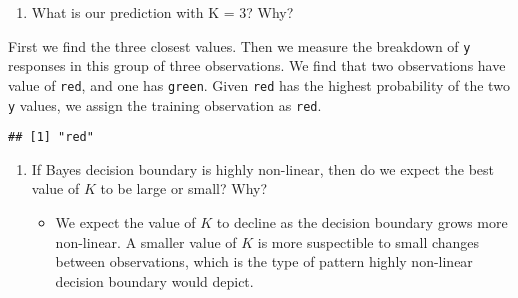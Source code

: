 \documentclass[]{book}
\newenvironment{Shaded}{\begin{snugshade}}{\end{snugshade}}
\newcommand{\DataTypeTok}[1]{\textcolor[rgb]{0.13,0.29,0.53}{#1}}
\newcommand{\DecValTok}[1]{\textcolor[rgb]{0.00,0.00,0.81}{#1}}
\newcommand{\KeywordTok}[1]{\textcolor[rgb]{0.13,0.29,0.53}{\textbf{#1}}}
\newcommand{\NormalTok}[1]{#1}
\newcommand{\OperatorTok}[1]{\textcolor[rgb]{0.81,0.36,0.00}{\textbf{#1}}}
\newcommand{\StringTok}[1]{\textcolor[rgb]{0.31,0.60,0.02}{#1}}
\providecommand{\tightlist}{%
  \setlength{\itemsep}{0pt}\setlength{\parskip}{0pt}}
\begin{document}
\begin{enumerate}
\def\labelenumi{(\alph{enumi})}
\setcounter{enumi}{2}
\tightlist
\item
  What is our prediction with K = 3? Why?
\end{enumerate}

First we find the three closest values. Then we measure the breakdown of \texttt{y} responses in this group of three observations. We find that two observations have value of \texttt{red}, and one has \texttt{green}. Given \texttt{red} has the highest probability of the two \texttt{y} values, we assign the training observation as \texttt{red}.

\begin{Shaded}
\end{Shaded}

\begin{verbatim}
## [1] "red"
\end{verbatim}

\begin{enumerate}
\def\labelenumi{(\alph{enumi})}
\setcounter{enumi}{3}
\tightlist
\item
  If Bayes decision boundary is highly non-linear, then do we expect the best value of \(K\) to be large or small? Why?

  \begin{itemize}
  \tightlist
  \item
    We expect the value of \(K\) to decline as the decision boundary grows more non-linear. A smaller value of \(K\) is more suspectible to small changes between observations, which is the type of pattern highly non-linear decision boundary would depict.
  \end{itemize}
\end{enumerate}
\end{document}
